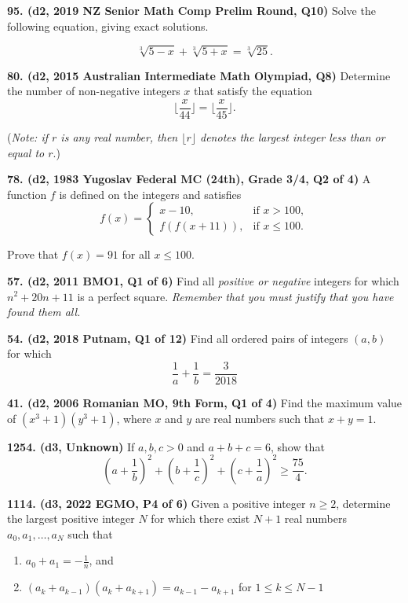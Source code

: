 \documentclass{article}
\begin{document}
\textbf{95. (\color{red}d2\color{black}, 2019 NZ Senior Math Comp Prelim Round, Q10)} Solve the following equation, giving exact solutions.

\[\sqrt[3]{5-x} + \sqrt[3]{5+x}=\sqrt[3]{25}.\]

\textbf{80. (\color{red}d2\color{black}, 2015 Australian Intermediate Math Olympiad, Q8)} Determine the number of non-negative integers \(x\) that satisfy the equation \[ \lfloor \frac{x}{44}  \rfloor  =  \lfloor \frac{x}{45}  \rfloor .\]

(\textit{Note: if \(r\) is any real number, then \(\lfloor r \rfloor\) denotes the largest integer less than or equal to \(r\)}.)

\textbf{78. (\color{red}d2\color{black}, 1983 Yugoslav Federal MC (24th), Grade 3/4, Q2 of 4)} A function \(f\) is defined on the integers and satisfies \[ f(x) = \begin{cases} x-10, & \text{if } x > 100,\\ f(f(x+11)), & \text{if } x \leq 100. \end{cases}\]

Prove that \(f(x) = 91\) for all \(x \leq 100\).

\textbf{57. (\color{red}d2\color{black}, 2011 BMO1, Q1 of 6)} Find all \emph{positive or negative} integers for which $n^2+20n+11$ is a perfect square. \textit{Remember that you must justify that you have found them all.}

\textbf{54. (\color{red}d2\color{black}, 2018 Putnam, Q1 of 12)} Find all ordered pairs of integers $(a,b)$ for which $$\frac{1}{a}+\frac{1}{b}= \frac{3}{2018}$$

\textbf{41. (\color{red}d2\color{black}, 2006 Romanian MO, 9th Form, Q1 of 4)} Find the maximum value of $(x^3+1)(y^3+1)$, where $x$ and $y$ are real numbers such that $x + y = 1$.

\textbf{1254. (\color{red}d3\color{black}, Unknown)} If $a,b,c>0$ and $a+b+c=6$, show that \[ ( a + \frac 1b )^2 + ( b + \frac 1c )^2 + ( c + \frac 1a )^2 \geq \frac{75}{4}.\]

\textbf{1114. (\color{red}d3\color{black}, 2022 EGMO, P4 of 6)} Given a positive integer $n \geq 2$, determine the largest positive integer $N$ for which there exist $N+1$ real numbers $a_{0}, a_{1}, \ldots, a_{N}$ such that
\begin{enumerate}
    \item $a_{0}+a_{1}=-\frac{1}{n}$, and
    \item $(a_{k}+a_{k-1})(a_{k}+a_{k+1})=a_{k-1}-a_{k+1}$ for $1 \leq k \leq N-1$
\end{enumerate}
\end{document}
